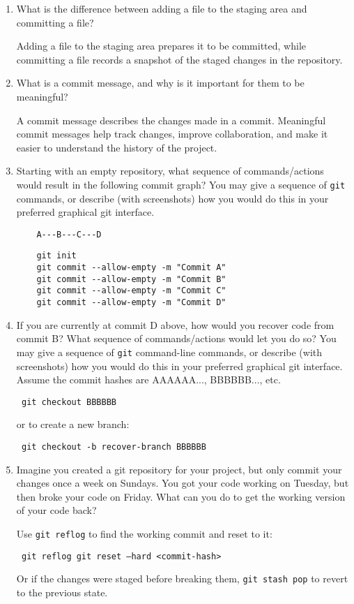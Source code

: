 \documentclass[10pt,twocolumn]{article}
\begin{document}
\begin{enumerate}
    \item What is the difference between adding a file to the staging area and committing a file?
    
    Adding a file to the staging area prepares it to be committed, while committing a file records a snapshot of the staged changes in the repository.
    
    \item What is a commit message, and why is it important for them to be meaningful?
    
    A commit message describes the changes made in a commit. Meaningful commit messages help track changes, improve collaboration, and make it easier to understand the history of the project.
    
    \item Starting with an empty repository, what sequence of commands/actions would result in the following commit graph? You may give a sequence of \texttt{git} commands, or describe (with screenshots) how you would do this in your preferred graphical git interface.
    
    \begin{verbatim}
    A---B---C---D
    \end{verbatim}
    
    \begin{lstlisting}
    git init
    git commit --allow-empty -m "Commit A"
    git commit --allow-empty -m "Commit B"
    git commit --allow-empty -m "Commit C"
    git commit --allow-empty -m "Commit D"
    \end{lstlisting}
    
    \item If you are currently at commit D above, how would you recover code from commit B? What sequence of commands/actions would let you do so? You may give a sequence of \texttt{git} command-line commands, or describe (with screenshots) how you would do this in your preferred graphical git interface. Assume the commit hashes are AAAAAA..., BBBBBB..., etc.
    
    \texttt{
    git checkout BBBBBB
    }
    
    or to create a new branch:
    
    \texttt{
    git checkout -b recover-branch BBBBBB
    }
    
    \item Imagine you created a git repository for your project, but only commit your changes once a week on Sundays. You got your code working on Tuesday, but then broke your code on Friday. What can you do to get the working version of your code back?
    
    Use \texttt{git reflog} to find the working commit and reset to it:
    
    \texttt{
    git reflog
    git reset --hard <commit-hash>
    }
    
    Or if the changes were staged before breaking them, \texttt{git stash pop} to revert to the previous state.
\end{enumerate}
\end{document}
